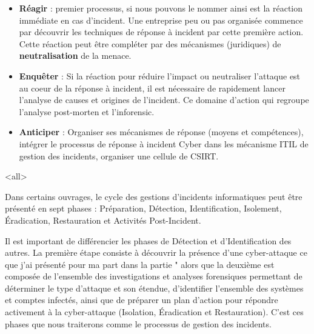\begin{itemize}
  \item \textbf{Réagir} : premier processus, si nous pouvons le nommer ainsi est  la réaction immédiate en cas d'incident. Une entreprise peu ou pas organisée commence par découvrir les techniques de réponse à incident par cette première action. Cette réaction peut être compléter par des mécanismes (juridiques) de \textbf{neutralisation} de la menace.

  \item \textbf{Enquêter} : Si la réaction pour réduire l'impact ou neutraliser l'attaque est au coeur de la réponse à incident, il est nécessaire de rapidement lancer l'analyse de causes et origines de l'incident. Ce domaine d'action qui regroupe l'analyse post-morten et l'inforensic.

  \item \textbf{Anticiper} : Organiser ses mécanismes de réponse (moyens et compétences), intégrer le processus de réponse à incident Cyber dans les mécanisme ITIL de gestion des incidents, organiser une cellule de CSIRT.

\end{itemize}


\mode<all>{}


Dans certains ouvrages, le cycle des gestions d’incidents informatiques  peut être  présenté  en sept phases : Préparation, Détection, Identification, Isolement, Éradication, Restauration et Activités Post-Incident. 

Il est important de différencier les phases de Détection et d’Identification des autres.  La première étape consiste à découvrir la présence d’une cyber-attaque ce que j'ai présenté pour ma part dans la partie "  alors que la deuxième est composée de l’ensemble des investigations et analyses forensiques permettant de déterminer le type d’attaque et son étendue, d’identifier l’ensemble des systèmes et comptes infectés, ainsi que de préparer un plan d’action pour répondre activement à la cyber-attaque (Isolation, Éradication et Restauration). C'est ces phases que nous traiterons comme le processus de gestion des incidents.











